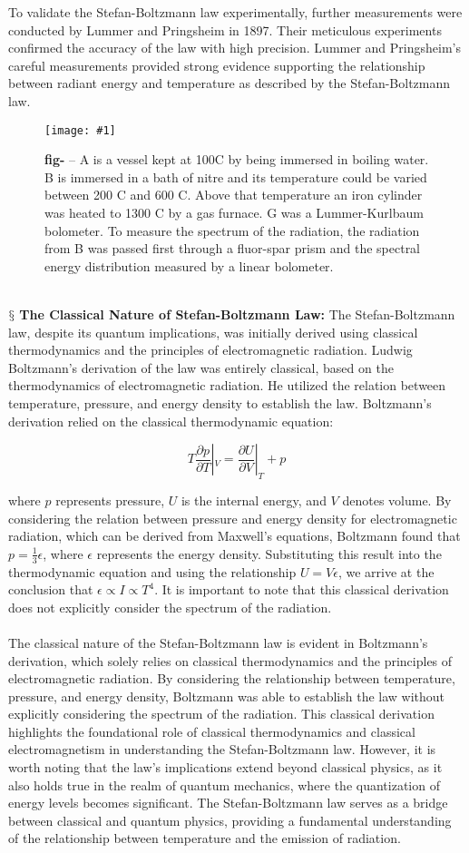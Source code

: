 \documentclass[9pt,a4paper, twocolumn]{article}
\newcounter{figurecounter}
\newcommand{\img}[3]{
    \begin{figure}[h!]
        \centering
        \captionsetup{justification=centering,margin=0cm,labelformat=empty}
        \texttt{[image: \#1]}
        \label{figure}
        \caption{\small\textbf{fig-\thefigurecounter} -- \textcolor{darkliver}{#3}}
    \end{figure}
    \addtocounter{figurecounter}{1}}
\newcommand{\newpoint}[1]{\ \\ \indent$\mathsection$ \textbf{#1}}
\begin{document}
        To validate the Stefan-Boltzmann law experimentally, further measurements were conducted by Lummer and Pringsheim in 1897. Their meticulous experiments confirmed the accuracy of the law with high precision. Lummer and Pringsheim's careful measurements provided strong evidence supporting the relationship between radiant energy and temperature as described by the Stefan-Boltzmann law.
        \img{LummerExperiment.jpeg}{1}{A is a vessel kept at 100C by being immersed in boiling water. B is immersed in a bath of nitre and its temperature could be varied between 200 C and 600 C. Above that temperature an iron cylinder was heated to 1300 C by a gas furnace. G was a Lummer-Kurlbaum bolometer. To measure the spectrum of the radiation, the radiation from B was passed first through a fluor-spar prism and the spectral energy distribution measured by a linear bolometer.}
        \newpoint{The Classical Nature of Stefan-Boltzmann Law:} The Stefan-Boltzmann law, despite its quantum implications, was initially derived using classical thermodynamics and the principles of electromagnetic radiation. Ludwig Boltzmann's derivation of the law was entirely classical, based on the thermodynamics of electromagnetic radiation. He utilized the relation between temperature, pressure, and energy density to establish the law. Boltzmann's derivation relied on the classical thermodynamic equation:

        \begin{equation}
            T\frac{\partial p}{\partial T}|_V = \frac{\partial U}{\partial V}|_T + p
        \end{equation}
        
        where $p$ represents pressure, $U$ is the internal energy, and $V$ denotes volume. By considering the relation between pressure and energy density for electromagnetic radiation, which can be derived from Maxwell's equations, Boltzmann found that $p = \frac{1}{3}\epsilon$, where $\epsilon$ represents the energy density. Substituting this result into the thermodynamic equation and using the relationship $U = V\epsilon$, we arrive at the conclusion that $\epsilon \propto I \propto T^4$. It is important to note that this classical derivation does not explicitly consider the spectrum of the radiation.
        \\
        \\    
        The classical nature of the Stefan-Boltzmann law is evident in Boltzmann's derivation, which solely relies on classical thermodynamics and the principles of electromagnetic radiation. By considering the relationship between temperature, pressure, and energy density, Boltzmann was able to establish the law without explicitly considering the spectrum of the radiation. This classical derivation highlights the foundational role of classical thermodynamics and classical electromagnetism in understanding the Stefan-Boltzmann law. However, it is worth noting that the law's implications extend beyond classical physics, as it also holds true in the realm of quantum mechanics, where the quantization of energy levels becomes significant. The Stefan-Boltzmann law serves as a bridge between classical and quantum physics, providing a fundamental understanding of the relationship between temperature and the emission of radiation.
\end{document}
